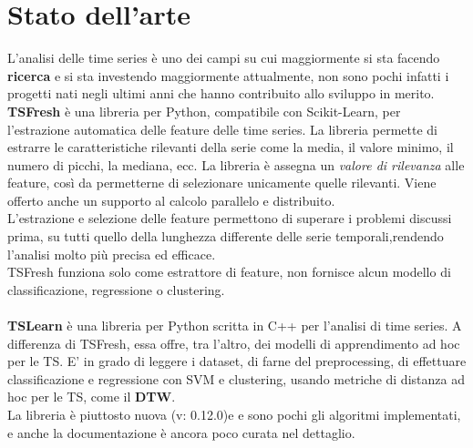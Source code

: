 \section{Stato dell'arte}
L'analisi delle time series è uno dei campi su cui maggiormente si sta facendo \textbf{ricerca} e si sta investendo maggiormente attualmente, non sono pochi infatti i progetti nati negli ultimi anni  che hanno contribuito allo sviluppo in merito.\\
\textbf{TSFresh}\cite{tsfresh} è una libreria per Python, compatibile con Scikit-Learn, per l'estrazione automatica delle feature delle time series. La libreria permette di estrarre  le caratteristiche rilevanti della serie come la media, il valore minimo, il numero di picchi, la mediana, ecc. La libreria è assegna un \textit{valore di rilevanza} alle feature, così da permetterne di selezionare unicamente quelle rilevanti. Viene offerto anche un supporto al calcolo parallelo e distribuito.\\
L'estrazione e selezione delle feature permettono di superare i problemi discussi prima, su tutti quello della lunghezza differente delle serie temporali,rendendo l'analisi molto più precisa ed efficace.\\
TSFresh funziona solo come estrattore di feature, non fornisce alcun modello di classificazione, regressione o clustering.\\
\\
\textbf{TSLearn}\cite{tslearn} è una libreria per Python scritta in C++ per l'analisi di time series. A differenza di TSFresh, essa offre, tra l'altro, dei modelli di apprendimento ad hoc per le TS. E' in grado di leggere i dataset, di farne del preprocessing, di effettuare classificazione e regressione con SVM e clustering, usando metriche di distanza ad hoc per le TS, come il \textbf{DTW}.\\
La libreria è piuttosto nuova (v: 0.12.0)e e sono pochi gli algoritmi implementati, e anche la documentazione è ancora poco curata nel dettaglio.

